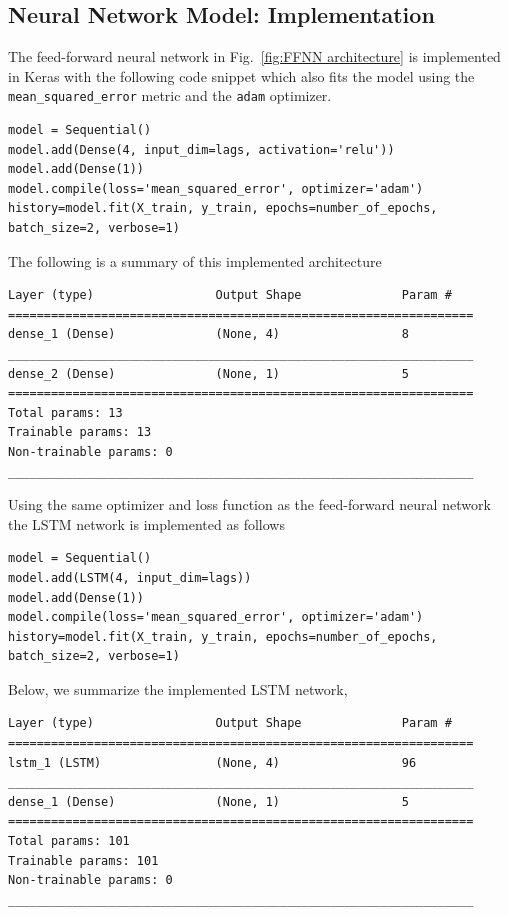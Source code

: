\documentclass[10pt,a4paper]{article}
\begin{document}
\subsection{Neural Network Model: Implementation}\label{section: Fitting NN}
The feed-forward neural network in Fig.~\ref{fig:FFNN architecture} is implemented in Keras with the following code snippet which also fits the model using the \verb|mean_squared_error| metric and the \verb|adam| optimizer.
\begin{lstlisting}
model = Sequential()
model.add(Dense(4, input_dim=lags, activation='relu'))
model.add(Dense(1))
model.compile(loss='mean_squared_error', optimizer='adam')
history=model.fit(X_train, y_train, epochs=number_of_epochs, batch_size=2, verbose=1)
\end{lstlisting}
The following is a summary of this implemented architecture
\begin{lstlisting}
Layer (type)                 Output Shape              Param #   
=================================================================
dense_1 (Dense)              (None, 4)                 8         
_________________________________________________________________
dense_2 (Dense)              (None, 1)                 5         
=================================================================
Total params: 13
Trainable params: 13
Non-trainable params: 0
_________________________________________________________________
\end{lstlisting}


Using the same optimizer and loss function as the feed-forward neural network the LSTM network is implemented as follows
\begin{lstlisting}
model = Sequential()
model.add(LSTM(4, input_dim=lags))
model.add(Dense(1))
model.compile(loss='mean_squared_error', optimizer='adam')
history=model.fit(X_train, y_train, epochs=number_of_epochs, batch_size=2, verbose=1)
\end{lstlisting}
Below, we summarize the implemented LSTM network,
\begin{lstlisting}
Layer (type)                 Output Shape              Param #   
=================================================================
lstm_1 (LSTM)                (None, 4)                 96        
_________________________________________________________________
dense_1 (Dense)              (None, 1)                 5         
=================================================================
Total params: 101
Trainable params: 101
Non-trainable params: 0
_________________________________________________________________
\end{lstlisting}
\end{document}
